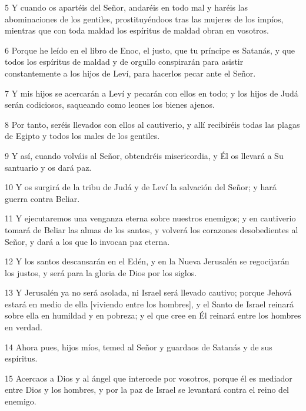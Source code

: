 \par 5 Y cuando os apartéis del Señor, andaréis en todo mal y haréis las abominaciones de los gentiles, prostituyéndoos tras las mujeres de los impíos, mientras que con toda maldad los espíritus de maldad obran en vosotros.

\par 6 Porque he leído en el libro de Enoc, el justo, que tu príncipe es Satanás, y que todos los espíritus de maldad y de orgullo conspirarán para asistir constantemente a los hijos de Leví, para hacerlos pecar ante el Señor.

\par 7 Y mis hijos se acercarán a Leví y pecarán con ellos en todo; y los hijos de Judá serán codiciosos, saqueando como leones los bienes ajenos.

\par 8 Por tanto, seréis llevados con ellos al cautiverio, y allí recibiréis todas las plagas de Egipto y todos los males de los gentiles.

\par 9 Y así, cuando volváis al Señor, obtendréis misericordia, y Él os llevará a Su santuario y os dará paz.

\par 10 Y os surgirá de la tribu de Judá y de Leví la salvación del Señor; y hará guerra contra Beliar.

\par 11 Y ejecutaremos una venganza eterna sobre nuestros enemigos; y en cautiverio tomará de Beliar las almas de los santos, y volverá los corazones desobedientes al Señor, y dará a los que lo invocan paz eterna.

\par 12 Y los santos descansarán en el Edén, y en la Nueva Jerusalén se regocijarán los justos, y será para la gloria de Dios por los siglos.

\par 13 Y Jerusalén ya no será asolada, ni Israel será llevado cautivo; porque Jehová estará en medio de ella [viviendo entre los hombres], y el Santo de Israel reinará sobre ella en humildad y en pobreza; y el que cree en Él reinará entre los hombres en verdad.

\par 14 Ahora pues, hijos míos, temed al Señor y guardaos de Satanás y de sus espíritus.

\par 15 Acercaos a Dios y al ángel que intercede por vosotros, porque él es mediador entre Dios y los hombres, y por la paz de Israel se levantará contra el reino del enemigo.

